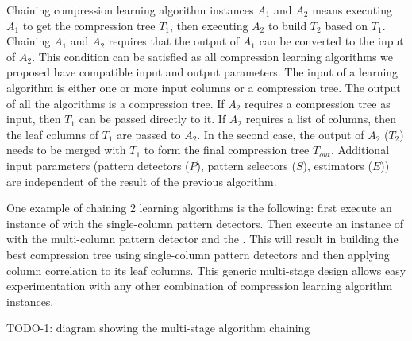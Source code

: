 Chaining compression learning algorithm instances \(A_{1}\) and \(A_{2}\) means executing \(A_{1}\) to get the compression tree \(T_{1}\), then executing \(A_{2}\) to build \(T_{2}\) based on \(T_{1}\). Chaining \(A_{1}\) and \(A_{2}\) requires that the output of \(A_{1}\) can be converted to the input of \(A_{2}\). This condition can be satisfied as all compression learning algorithms we proposed have compatible input and output parameters. The input of a learning algorithm is either one or more input columns or a compression tree. The output of all the algorithms is a compression tree. If \(A_{2}\) requires a compression tree as input, then \(T_{1}\) can be passed directly to it. If \(A_{2}\) requires a list of columns, then the leaf columns of \(T_{1}\) are passed to \(A_{2}\). In the second case, the output of \(A_{2}\) (\(T_{2}\)) needs to be merged with \(T_{1}\) to form the final compression tree \(T_{out}\). Additional input parameters (pattern detectors (\(P\)), pattern selectors (\(S\)), estimators (\(E\))) are independent of the result of the previous algorithm.

One example of chaining 2 learning algorithms is the following: first execute an instance of  with the single-column pattern detectors. Then execute an instance of  with the multi-column pattern detector  and the . This will result in building the best compression tree using single-column pattern detectors and then applying column correlation to its leaf columns. This generic multi-stage design allows easy experimentation with any other combination of compression learning algorithm instances.

TODO-1: diagram showing the multi-stage algorithm chaining

